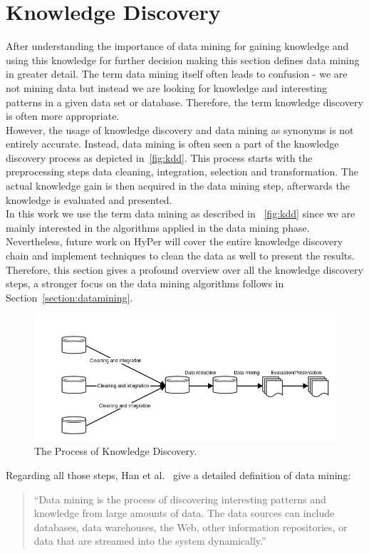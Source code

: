 \section{Knowledge Discovery}

After understanding the importance of data mining for gaining knowledge and using this knowledge for further decision making this section defines data mining in greater detail. The term data mining itself often leads to confusion - we are not mining data but instead we are looking for knowledge and interesting patterns in a given data set or database. Therefore, the term knowledge discovery is often more appropriate.
\\
However, the usage of knowledge discovery and data mining as synonyms is not entirely accurate. Instead, data mining is often seen a part of the knowledge discovery process as depicted in~\autoref{fig:kdd}. This process starts with the preprocessing steps data cleaning, integration, selection and transformation. The actual knowledge gain is then acquired in the data mining step, afterwards the knowledge is evaluated and presented. 
\\
In this work we use the term data mining as described in ~\autoref{fig:kdd} since we are mainly interested in the algorithms applied in the data mining phase. Nevertheless, future work on HyPer will cover the entire knowledge discovery chain and implement techniques to clean the data as well to present the results. Therefore, this section gives a profound overview over all the knowledge discovery steps, a stronger focus on the data mining algorithms follows in Section~\ref{section:datamining}.


\begin{figure}[htsb]
  \centering
  \includegraphics[scale=0.5]{figures/kdd}
  \caption[The Process of Knowledge Discovery]{The Process of Knowledge Discovery.}\label{fig:kdd}
\end{figure}


Regarding all those steps, Han et al.~\parencite[210-100]{dmbook} give a detailed definition of data mining: 
\begin{quote}
“Data mining is the process of discovering interesting patterns and knowledge from large amounts of data. The data sources can include databases, data warehouses, the Web, other information repositories, or data that are streamed into the system dynamically.”
\end{quote}

